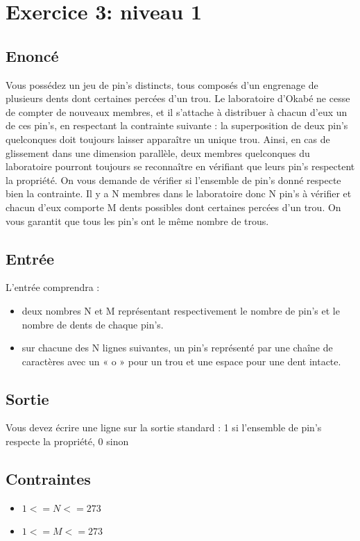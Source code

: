 \documentclass{article}
\begin{document}
    \section{Exercice 3: niveau 1}
        \subsection{Enoncé}
            Vous possédez un jeu de pin’s distincts, tous composés d’un engrenage de plusieurs dents dont certaines
            percées d’un trou. Le laboratoire d’Okabé ne cesse de compter de nouveaux membres, et il s’attache à
            distribuer à chacun d’eux un de ces pin’s, en respectant la contrainte suivante : la superposition de deux
            pin’s quelconques doit toujours laisser apparaître un unique trou.
            Ainsi, en cas de glissement dans une dimension parallèle, deux membres quelconques du laboratoire
            pourront toujours se reconnaître en vérifiant que leurs pin’s respectent la propriété.
            On vous demande de vérifier si l’ensemble de pin’s donné respecte bien la contrainte. Il y a N membres
            dans le laboratoire donc N pin’s à vérifier et chacun d’eux comporte M dents possibles dont certaines percées
            d’un trou. On vous garantit que tous les pin’s ont le même nombre de trous.
        
        \subsection{Entrée}
            L’entrée comprendra :
            \begin{itemize}
                \item deux nombres N et M représentant respectivement le nombre de pin’s et le nombre de dents de chaque pin’s.
                \item sur chacune des N lignes suivantes, un pin’s représenté par une chaîne de caractères avec un « o » pour un trou et une espace pour une dent intacte.
            \end{itemize}
        
        \subsection{Sortie}
            Vous devez écrire une ligne sur la sortie standard : 1 si l’ensemble de pin’s respecte la propriété, 0 sinon

        \subsection{Contraintes}
            \begin{itemize}
                \item $1 <= N <= 273$
                \item $1 <= M <= 273$
            \end{itemize}
\end{document}
